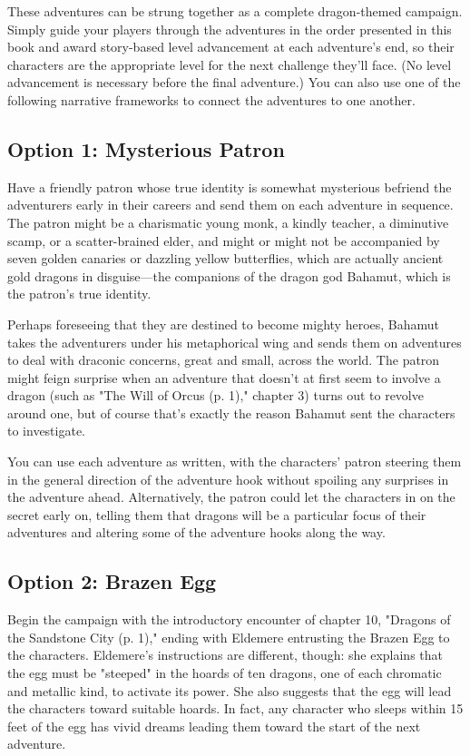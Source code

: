 \documentclass[letterpaper, 11pt, twocolumn]{dndbook}
\begin{document}
These adventures can be strung together as a complete dragon-themed campaign. Simply guide your players through the adventures in the order presented in this book and award story-based level advancement at each adventure's end, so their characters are the appropriate level for the next challenge they'll face. (No level advancement is necessary before the final adventure.) You can also use one of the following narrative frameworks to connect the adventures to one another.

\subsection{Option 1: Mysterious Patron}

Have a friendly patron whose true identity is somewhat mysterious befriend the adventurers early in their careers and send them on each adventure in sequence. The patron might be a charismatic young monk, a kindly teacher, a diminutive scamp, or a scatter-brained elder, and might or might not be accompanied by seven golden canaries or dazzling yellow butterflies, which are actually ancient gold dragons in disguise---the companions of the dragon god Bahamut, which is the patron's true identity.

Perhaps foreseeing that they are destined to become mighty heroes, Bahamut takes the adventurers under his metaphorical wing and sends them on adventures to deal with draconic concerns, great and small, across the world. The patron might feign surprise when an adventure that doesn't at first seem to involve a dragon (such as "The Will of Orcus (p. 1)," chapter 3) turns out to revolve around one, but of course that's exactly the reason Bahamut sent the characters to investigate.

You can use each adventure as written, with the characters' patron steering them in the general direction of the adventure hook without spoiling any surprises in the adventure ahead. Alternatively, the patron could let the characters in on the secret early on, telling them that dragons will be a particular focus of their adventures and altering some of the adventure hooks along the way.

\subsection{Option 2: Brazen Egg}

Begin the campaign with the introductory encounter of chapter 10, "Dragons of the Sandstone City (p. 1)," ending with Eldemere entrusting the Brazen Egg to the characters. Eldemere's instructions are different, though: she explains that the egg must be "steeped" in the hoards of ten dragons, one of each chromatic and metallic kind, to activate its power. She also suggests that the egg will lead the characters toward suitable hoards. In fact, any character who sleeps within 15 feet of the egg has vivid dreams leading them toward the start of the next adventure.
\end{document}
